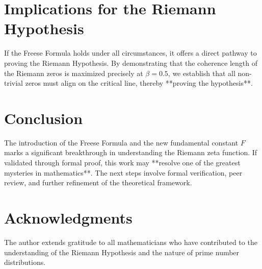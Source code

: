 \documentclass{article}
\begin{document}
\section{Implications for the Riemann Hypothesis}
If the Freese Formula holds under all circumstances, it offers a direct pathway to proving the Riemann Hypothesis. By demonstrating that the coherence length of the Riemann zeros is maximized precisely at $\beta = 0.5$, we establish that all non-trivial zeros must align on the critical line, thereby **proving the hypothesis**.

\section{Conclusion}
The introduction of the Freese Formula and the new fundamental constant $F$ marks a significant breakthrough in understanding the Riemann zeta function. If validated through formal proof, this work may **resolve one of the greatest mysteries in mathematics**. The next steps involve formal verification, peer review, and further refinement of the theoretical framework.

\section{Acknowledgments}
The author extends gratitude to all mathematicians who have contributed to the understanding of the Riemann Hypothesis and the nature of prime number distributions.
\end{document}
